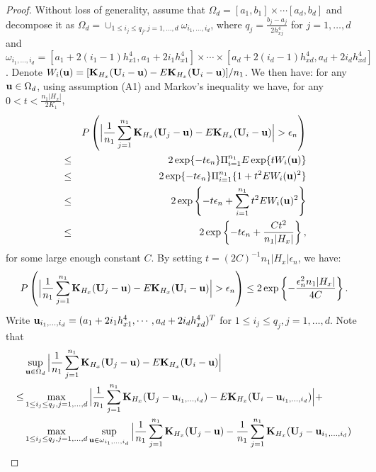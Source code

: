 \documentclass[11pt]{article}
\theoremstyle{definition}
\begin{document}
 \begin{proof}
 	
 	Without loss of generality, assume that $\Omega_d=[a_1,b_1]\times\cdots[a_d,b_d]$ and decompose it as $\Omega_d=\cup_{1\leq i_j \leq q_j, j=1,\ldots,d} \omega_{i_1,\ldots,i_d}$, where $q_j=\frac{b_j-a_j}{2h_{xj}^4}$ for $j=1,\ldots, d$ and $\omega_{i_1,\ldots,i_d}=[a_1+2(i_1-1)h_{x1}^4, a_1+2i_1h_{x1}^4]\times\cdots\times[a_d+2(i_d-1)h_{xd}^4, a_d+2i_dh_{xd}^4]$. Denote $W_i({\bf u})=[{\bf K}_{H_x}({\bf U}_i-{\bf u})-E{\bf K}_{H_x}({\bf U}_i-{\bf u})]/n_1$.  We then have:
 	for any ${\bf u}\in \Omega_d$, using assumption (A1) and Markov's inequality we have, for any $0<t<\frac{n_1|H_x|}{2K_1}$,
 	\begin{eqnarray}\label{lamma1.1}
 		&&P\left(\Big|\frac{1}{n_1}\sum_{j=1}^{n_1}{\bf K}_{H_x}({\bf U}_j-{\bf u})-E{\bf K}_{H_x}({\bf U}_i-{\bf u})\Big|>\epsilon_n \right) \\
 		&\leq&  2 \exp\{-t\epsilon_n\}\Pi_{i=1}^{n_1}E  \exp\{tW_i({\bf u})\}       \nonumber\\
 		&\leq& 2 \exp\{-t\epsilon_n\}\Pi_{i=1}^{n_1}\{1+t^2EW_i({\bf u})^2 \}  \nonumber\\
 		&\leq& 2\exp\left\{-t\epsilon_n+\sum_{i=1}^{n_1}t^2E W_i({\bf u})^2\right\} \nonumber\\
 		&\leq& 2\exp\left\{-t\epsilon_n+\frac{Ct^2}{n_1|H_x|}\right\}, \nonumber
 	\end{eqnarray}
 	for some large enough constant $C$. By setting $t=(2C)^{-1}n_1|H_x|\epsilon_n$, we have:
 	\begin{equation}\label{lemma1.2}
 		P\left(\Big|\frac{1}{n_1}\sum_{j=1}^{n_1}{\bf K}_{H_x}({\bf U}_j-{\bf u})-E{\bf K}_{H_x}({\bf U}_i-{\bf u})\Big|>\epsilon_n \right) \leq 2\exp\left\{-\frac{\epsilon_n^2n_1|H_x|}{4C}\right\}.
 	\end{equation}
 	Write ${\bf u}_{i_1,\ldots,i_d}=(a_1+2i_1h_{x1}^4,\cdots, a_d+2i_dh_{xd}^4)^T$ for $1\leq i_j \leq q_j, j=1,\ldots,d$. Note that
 	\begin{align}\label{lemma1.3}
 		&\sup_{{\bf u}\in \Omega_d}\Big|\frac{1}{n_1}\sum_{j=1}^{n_1}{\bf K}_{H_x}({\bf U}_j-{\bf u})-E{\bf K}_{H_x}({\bf U}_i-{\bf u})\Big| \\
 		\leq&
 		\max_{1\leq i_j \leq q_j, j=1,\ldots,d}\Big|\frac{1}{n_1}\sum_{j=1}^{n_1}{\bf K}_{H_x}({\bf U}_j-{\bf u}_{i_1,\ldots,i_d})-E{\bf K}_{H_x}({\bf U}_i-{\bf u}_{i_1,\ldots,i_d})\Big|+ \nonumber\\
 		&\max_{1\leq i_j \leq q_j, j=1,\ldots,d}\sup_{{\bf u}\in\omega_{i_1,\ldots,i_d}}\Big|\frac{1}{n_1}\sum_{j=1}^{n_1}{\bf K}_{H_x}({\bf U}_j-{\bf u})-\frac{1}{n_1}\sum_{j=1}^{n_1}{\bf K}_{H_x}({\bf U}_j- {\bf u}_{i_1,\ldots,i_d})  \nonumber\\

\end{align}
\end{proof}
\end{document}
